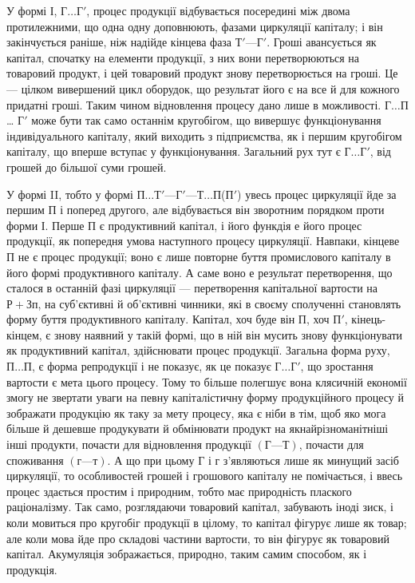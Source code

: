 У формі І, $Г\dots{} Г'$, процес продукції відбувається посередині між двома
протилежними, що одна одну доповнюють, фазами циркуляції капіталу;
і він закінчується раніше, ніж надійде кінцева фаза $Т' — Г'$. Гроші авансується
як капітал, спочатку на елементи продукції, з них вони перетворюються
на товаровий продукт, і цей товаровий продукт знову перетворюється
на гроші. Це — цілком вивершений цикл оборудок, що результат
його є на все й для кожного придатні гроші. Таким чином відновлення
процесу дано лише в можливості. $Г\dots{} П$\dots{} $Г'$ може бути так само останнім
кругобігом, що вивершує функціонування індивідуального капіталу, який
виходить з підприємства, як і першим кругобігом капіталу, що вперше
вступає у функціонування. Загальний рух тут є $Г\dots{} Г'$, від грошей до більшої
суми грошей.

У формі II, тобто у формі $П\dots{} Т' — Г' — Т\dots{} П$($П'$) увесь процес циркуляції
йде за першим $П$ і поперед другого, але відбувається він зворотним
порядком проти форми І. Перше $П$ є продуктивний капітал, і його функдія
е його процес продукції, як попередня умова наступного процесу
циркуляції. Навпаки, кінцеве $П$ не є процес продукції; воно є лише
повторне буття промислового капіталу в його формі продуктивного
капіталу. А саме воно е результат перетворення, що сталося в
останній фазі циркуляції — перетворення капітальної вартости на $Р + Зп$,
на суб’єктивні й об’єктивні чинники, які в своєму сполученні становлять
форму буття продуктивного капіталу. Капітал, хоч буде він $П$, хоч $П'$,
кінець-кінцем, є знову наявний у такій формі, що в ній він мусить знову
функціонувати як продуктивний капітал, здійснювати процес продукції.
Загальна форма руху, $П\dots{} П$, є форма репродукції і не показує, як це показує
$Г\dots{} Г'$, що зростання вартости є мета цього процесу. Тому то більше полегшує
вона клясичній економії змогу не звертати уваги на певну капіталістичну
форму продукційного процесу й зображати продукцію як таку
за мету процесу, яка є ніби в тім, щоб яко мога більше й дешевше
продукувати й обмінювати продукт на якнайрізноманітніші інші продукти,
почасти для відновлення продукції $(Г — Т)$, почасти для споживання
$(г — т)$. А що при цьому $Г$ і $г$ з’являються лише як минущий засіб
циркуляції, то особливостей грошей і грошового капіталу не помічається, і
ввесь процес здається простим і природним, тобто має природність
плаского раціоналізму. Так само, розглядаючи товаровий капітал, забувають
іноді зиск, і коли мовиться про кругобіг продукції в цілому, то капітал
фігурує лише як товар; але коли мова йде про складові частини вартости,
то він фігурує як товаровий капітал. Акумуляція зображається, природно,
таким самим способом, як і продукція.

